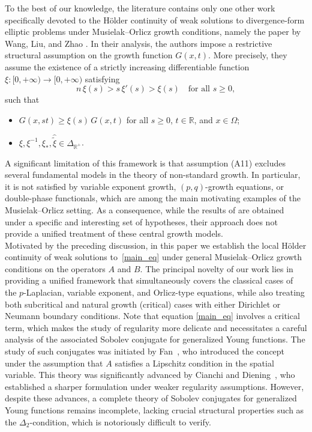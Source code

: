 \documentclass[10pt,reqno]{amsart}
\newcommand *\w{^\wedge}
\theoremstyle{definition}
\numberwithin{equation}{section}
\begin{document}
To the best of our knowledge, the literature contains only one other work
specifically devoted to the Hölder continuity of weak solutions to divergence-form
elliptic problems under Musielak--Orlicz growth conditions, namely the paper by
Wang, Liu, and Zhao \cite{WaLiuZhao}. In their analysis, the authors impose a
restrictive structural assumption on the growth function $G(x,t)$. More
precisely, they assume the existence of a strictly increasing differentiable
function $\xi : [0,+\infty) \to [0,+\infty)$ satisfying
\[
n\,\xi(s) > s\,\xi'(s) > \xi(s) \quad \text{for all } s \ge 0,
\]
such that
\begin{itemize}
    \item[(A11)] $G(x, s t) \ge \xi(s)\, G(x,t)$ for all $s \ge 0$, $t \in \mathbb{R}$,
    and $x \in \Omega$;
    \item[(A12)] $\xi, \xi^{-1}, \xi_{\ast}, \widehat{\widetilde{\xi}} \in
    \Delta_{\mathbb{R}^{+}}$.
\end{itemize}
A significant limitation of this framework is that assumption (A11) excludes
several fundamental models in the theory of non-standard growth. In particular, it
is not satisfied by variable exponent growth, $(p,q)$-growth equations, or
double-phase functionals, which are among the main motivating examples of the
Musielak--Orlicz setting. As a consequence, while the results of \cite{WaLiuZhao}
are obtained under a specific and interesting set of hypotheses, their approach
does not provide a unified treatment of these central growth models.
\\

Motivated by the preceding discussion, in this paper we establish the local H\"older continuity of weak solutions to~\eqref{main_eq} under general Musielak--Orlicz growth conditions on the operators $A$ and $B$.
The principal novelty of our work lies in providing a unified framework that simultaneously covers the classical cases of the $p$-Laplacian, variable exponent, and Orlicz-type equations, while also treating both subcritical and natural growth (critical) cases with either Dirichlet or Neumann boundary conditions. Note that equation \eqref{main_eq} involves a critical term, which makes the study of regularity more delicate and necessitates a careful analysis of the associated Sobolev conjugate for generalized Young functions.
 The study of such conjugates was initiated by Fan~\cite{Fan2012a}, who introduced the concept under the assumption that $A$ satisfies a Lipschitz condition in the spatial variable. This theory was significantly advanced by Cianchi and Diening~\cite{Cianchi2024}, who established a sharper formulation under weaker regularity assumptions. However, despite these advances, a complete theory of Sobolev conjugates for generalized Young functions remains incomplete, lacking crucial structural properties such as the $\Delta_2$-condition, which is notoriously difficult to verify.\\
 
\end{document}
